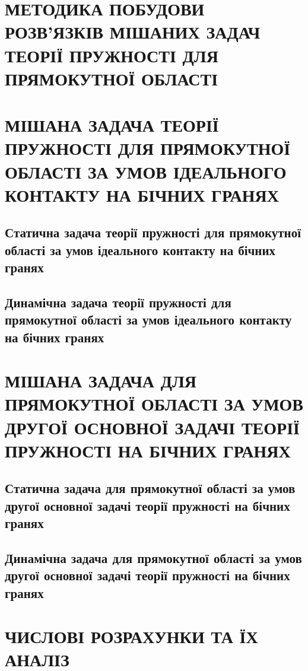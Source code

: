 \documentclass[a4paper,14pt]{extarticle}
\numberwithin{equation}{section}
\begin{document}
\section{МЕТОДИКА ПОБУДОВИ РОЗВ’ЯЗКІВ МІШАНИХ ЗАДАЧ ТЕОРІЇ ПРУЖНОСТІ ДЛЯ ПРЯМОКУТНОЇ ОБЛАСТІ}

\newpage

\section[МІШАНА ЗАДАЧА ТЕОРІЇ ПРУЖНОСТІ ДЛЯ ПРЯМОКУТНОЇ ОБЛАСТІ ЗА УМОВ ІДЕАЛЬНОГО КОНТАКТУ НА БІЧНИХ ГРАНЯХ]
{\centering МІШАНА ЗАДАЧА ТЕОРІЇ ПРУЖНОСТІ ДЛЯ ПРЯМОКУТНОЇ ОБЛАСТІ ЗА УМОВ ІДЕАЛЬНОГО КОНТАКТУ НА БІЧНИХ ГРАНЯХ}

\subsection{Статична задача теорії пружності для прямокутної області за умов ідеального контакту на бічних гранях}

\subsection{Динамічна задача теорії пружності для прямокутної області за умов ідеального контакту на бічних гранях}



\newpage

\section[МІШАНА ЗАДАЧА ДЛЯ ПРЯМОКУТНОЇ ОБЛАСТІ ЗА УМОВ ДРУГОЇ ОСНОВНОЇ ЗАДАЧІ ТЕОРІЇ ПРУЖНОСТІ НА БІЧНИХ ГРАНЯХ]
{\centering МІШАНА ЗАДАЧА ДЛЯ ПРЯМОКУТНОЇ ОБЛАСТІ ЗА УМОВ ДРУГОЇ ОСНОВНОЇ ЗАДАЧІ ТЕОРІЇ ПРУЖНОСТІ НА БІЧНИХ ГРАНЯХ}

\subsection{Статична задача для прямокутної області за умов другої основної задачі теорії пружності на бічних гранях}

\subsection{Динамічна задача для прямокутної області за умов другої основної задачі теорії пружності на бічних гранях}



\newpage

\section[ЧИСЛОВІ РОЗРАХУНКИ ТА ЇХ АНАЛІЗ]
{\centering ЧИСЛОВІ РОЗРАХУНКИ ТА ЇХ АНАЛІЗ}

\end{document}
